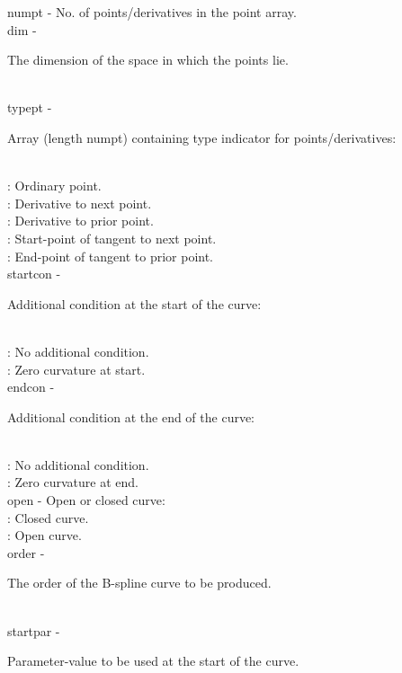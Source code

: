 	\>\>	{\fov numpt}	\> - \>	
				No. of points/derivatives in the
				point array.
				\\
	\>\>	{\fov dim}	\> - \>	\begin{minipg2}
				The dimension of the space in which
				the points lie.
				\end{minipg2}\\
	\>\>	{\fov typept}	\> - \>	\begin{minipg2}
				Array (length numpt) containing type
				indicator for points/derivatives:
				\end{minipg2} \\[0.3ex]
		\>\>\>\> : Ordinary point.\\
		\>\>\>\> : Derivative to next point.\\
		\>\>\>\> : Derivative to prior point.\\
		\>\>\>\> : Start-point of tangent to next point.\\
		\>\>\>\> : End-point of tangent to prior point.\\
\newpagetabs
	\>\>	{\fov startcon}	\> - \>	\begin{minipg2}
				Additional condition at the start
				of the curve:
				\end{minipg2}\\
		\>\>\>\> : 	No additional condition.\\
		\>\>\>\> : 	Zero curvature at start.\\
	\>\>	{\fov endcon}	\> - \>	\begin{minipg2}
				Additional condition at the end
				of the curve:
				\end{minipg2}\\
		\>\>\>\> : 	No additional condition.\\
		\>\>\>\> : 	Zero curvature at end.\\
	\>\>	{\fov open}	\> - \>	Open or closed curve:\\
		\>\>\>\> : 	Closed curve.\\
		\>\>\>\> : 	Open curve.\\
	\>\>	{\fov order}	\> - \> \begin{minipg2}
				The order of the B-spline curve
				to be produced.
				\end{minipg2}\\
	\>\>	{\fov startpar}	\> - \>	\begin{minipg2}
				Parameter-value to be used at the
				start of the curve.
				\end{minipg2}\\
